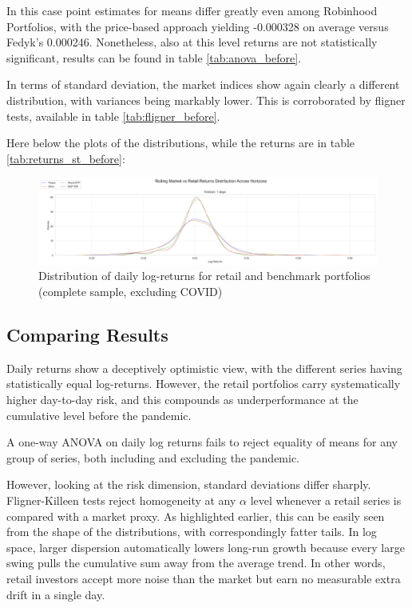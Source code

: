 In this case point estimates for means differ greatly even among Robinhood Portfolios, with the price-based approach yielding -0.000328 on average versus Fedyk's 0.000246.
Nonetheless, also at this level returns are not statistically significant, results can be found in table \ref{tab:anova_before}.

In terms of standard deviation, the market indices show again clearly a different distribution, with variances being markably lower. 
This is corroborated by fligner tests, available in table \ref{tab:fligner_before}.

Here below the plots of the distributions, while the returns are in table \ref{tab:returns_st_before}:
\begin{figure}[H]
    \centering
    \includegraphics[width=1\linewidth]
    {../images/distributions/st_before.png}
    \caption{Distribution of daily log-returns for retail and benchmark portfolios (complete sample, excluding COVID)}
\end{figure}

\subsection{Comparing Results}
Daily returns show a deceptively optimistic view, with the different series having statistically equal log-returns.
However, the retail portfolios carry systematically higher day-to-day risk, and this compounds as underperformance at the cumulative level before the pandemic.

A one-way ANOVA on daily log returns fails to reject equality of means for any group of series, both including and excluding the pandemic. 

However, looking at the risk dimension, standard deviations differ sharply. 
Fligner-Killeen tests reject homogeneity at any $\alpha$ level whenever a retail series is compared with a market proxy.
As highlighted earlier, this can be easily seen from the shape of the distributions, with correspondingly fatter tails.
In log space, larger dispersion automatically lowers long-run growth because every large swing pulls the cumulative sum away from the average trend.
In other words, retail investors accept more noise than the market but earn no measurable extra drift in a single day.

